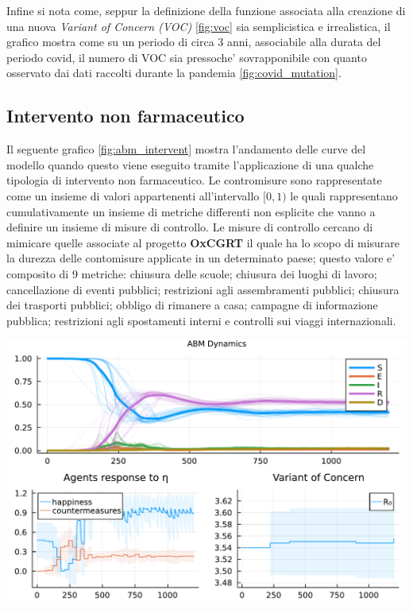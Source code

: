 Infine si nota come, seppur la definizione della funzione associata alla creazione di una
nuova \emph{Variant of Concern (VOC)} \ref{fig:voc} sia semplicistica e irrealistica, 
il grafico mostra come su un periodo di circa 3 anni, associabile alla durata del periodo covid, 
il numero di VOC sia pressoche' sovrapponibile con quanto osservato dai dati raccolti durante la pandemia \ref{fig:covid_mutation}. 

\subsection{Intervento non farmaceutico}
Il seguente grafico \ref{fig:abm_intervent} mostra l'andamento delle curve del modello
quando questo viene eseguito tramite l'applicazione di una qualche tipologia di intervento non farmaceutico. 
Le contromisure sono rappresentate come un insieme di valori appartenenti all'intervallo $[0, 1)$ 
le quali rappresentano cumulativamente un insieme di metriche differenti non esplicite che vanno a definire 
un insieme di misure di controllo. Le misure di controllo cercano di mimicare quelle associate al progetto 
\textbf{OxCGRT} il quale ha lo scopo di misurare la durezza delle contomisure applicate in un determinato paese; 
questo valore e' composito di 9 metriche: chiusura delle scuole; chiusura dei luoghi di lavoro; 
cancellazione di eventi pubblici; restrizioni agli assembramenti pubblici; 
chiusura dei trasporti pubblici; obbligo di rimanere a casa; campagne di informazione pubblica; 
restrizioni agli spostamenti interni e controlli sui viaggi internazionali.

\begin{minipage}{\linewidth}
	\centering
	\includegraphics[width=\textwidth]{img/SocialNetworkABM_CONTROL.pdf}
	\label{fig:abm_intervent}
\end{minipage}

